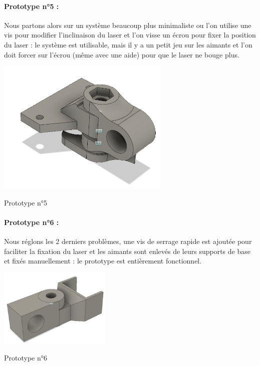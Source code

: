 \paragraph{Prototype n°5 :}
Nous partons alors sur un système beaucoup plus minimaliste ou l’on utilise une vis pour modifier l’inclinaison du laser et l'on visse un écrou pour fixer la position du laser : le système est utilisable, mais il y a un petit jeu sur les aimants et l’on doit forcer sur l’écrou (même avec une aide) pour que le laser ne bouge plus.
\begin{center}
    \includegraphics{photoHugo/image015.png}
    
    Prototype n°5
\end{center}

\paragraph{Prototype n°6 :}
Nous réglons les 2 derniers problèmes, une vis de serrage rapide est ajoutée pour faciliter la fixation du laser et les aimants sont enlevés de leurs supports de base et fixés manuellement : le prototype est entièrement fonctionnel. 
\begin{center}
    \includegraphics[width=0.4\textwidth]{photoHugo/image017}
    
    Prototype n°6
\end{center}

